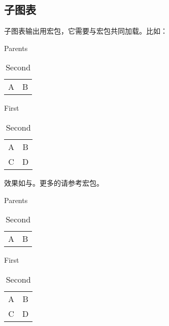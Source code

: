 \subsection{子图表}
子图表输出用宏包，它需要与宏包共同加载。比如：
\begin{latex}
\usepackage{caption,subcaption}
  \captionsetup[sub]{labelformat=simple}
  \renewcommand{\thesubtable}{(\alph{subtable})}
\begin{table}
\caption{Parents}
\begin{subtable}[b]{0.5\linewidth}
  \centering
  \begin{tabular}{|c|c|}
  A & B \\ \end{tabular}
  \caption{First}\label{...}
\end{subtable}  
\begin{subtable}[b]{0.5\linewidth}
  \centering
  \begin{tabular}{|c|c|}
  A & B \\ C & D \end{tabular}
  \caption{Second}
\end{subtable}  
\end{table}
\end{latex}

效果如与。更多的请参考宏包。
\begin{table}[!htb]
\caption{Parents}
\begin{subtable}[b]{0.5\linewidth}
  \centering
  \begin{tabular}{|c|c|}
  A & B \\ \end{tabular}
  \caption{First}\label{subtab:subcaption1}
\end{subtable}  
\begin{subtable}[b]{0.5\linewidth}
  \centering
  \begin{tabular}{|c|c|}
  A & B \\ C & D \end{tabular}
  \caption{Second}\label{subtab:subcaption2}
\end{subtable}  
\end{table}

